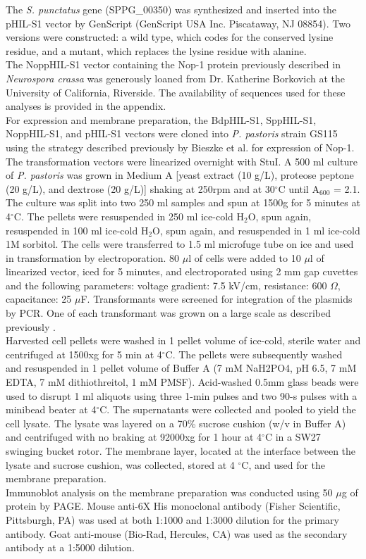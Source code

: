 \indent The \textit{S. punctatus} gene (SPPG\_00350) was synthesized and inserted into the pHIL-S1 vector by GenScript (GenScript USA Inc. Piscataway, NJ 08854). Two versions were constructed: a wild type, which codes for the conserved lysine residue, and a mutant, which replaces the lysine residue with alanine.  \\
\indent The NoppHIL-S1 vector containing the Nop-1 protein previously described in \textit{Neurospora crassa} \cite{Bieszke1999} was generously loaned from Dr. Katherine Borkovich at the University of California, Riverside. The availability of sequences used for these analyses is provided in the appendix.\\
\indent For expression and membrane preparation, the BdpHIL-S1, SppHIL-S1, NoppHIL-S1, and pHIL-S1 vectors were cloned into \textit{P. pastoris} strain GS115 using the strategy described previously by Bieszke et al. \nocite{Bieszke1999} for expression of Nop-1. The transformation vectors were linearized overnight with StuI. A 500 ml culture of \textit{P. pastoris} was grown in Medium A [yeast extract (10 g/L), proteose peptone (20 g/L), and dextrose (20 g/L)] shaking at 250rpm and at 30$^{\circ}$C until A$_{600}$ = 2.1. The culture was split into two 250 ml samples and spun at 1500g for 5 minutes at 4$^{\circ}$C. The pellets were resuspended in 250 ml ice-cold H$_{2}$O, spun again, resuspended in 100 ml ice-cold H$_{2}$O, spun again, and resuspended in 1 ml ice-cold 1M sorbitol. The cells were transferred to 1.5 ml microfuge tube on ice and used in transformation by electroporation. 80 $\mu$l of cells were added to 10 $\mu$l of linearized vector, iced for 5 minutes, and electroporated using 2 mm gap cuvettes and the following parameters: voltage gradient: 7.5 kV/cm, resistance: 600 $\Omega$, capacitance: 25 $\mu$F. Transformants were screened for integration of the plasmids by PCR. One of each transformant was grown on a large scale as described previously \cite{Bieszke1999}.\\
\indent Harvested cell pellets were washed in 1 pellet volume of ice-cold, sterile water and centrifuged at 1500xg for 5 min at 4$^{\circ}$C. The pellets were subsequently washed and resuspended in 1 pellet volume of Buffer A (7 mM NaH2PO4, pH 6.5, 7 mM EDTA, 7 mM dithiothreitol, 1 mM PMSF). Acid-washed 0.5mm glass beads were used to disrupt 1 ml aliquots using three 1-min pulses and two 90-s pulses with a minibead beater at 4$^{\circ}$C. The supernatants were collected and pooled to yield the cell lysate. The lysate was layered on a 70\% sucrose cushion (w/v in Buffer A) and centrifuged with no braking at 92000xg for 1 hour at 4$^{\circ}$C in a SW27 swinging bucket rotor. The membrane layer, located at the interface between the lysate and sucrose cushion, was collected, stored at 4 $^{\circ}$C, and used for the membrane preparation.\\
\indent Immunoblot analysis on the membrane preparation was conducted using 50 $\mu$g of protein by PAGE. Mouse anti-6X His monoclonal antibody (Fisher Scientific, Pittsburgh, PA) was used at both 1:1000 and 1:3000 dilution for the primary antibody. Goat anti-mouse (Bio-Rad, Hercules, CA) was used as the secondary antibody at a 1:5000 dilution.\\

